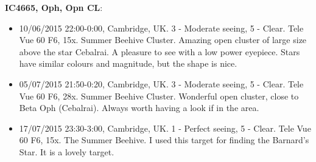 {\bf IC4665, Oph, Opn CL}:
\begin{itemize}
\item 10/06/2015 22:00-0:00, Cambridge, UK. 3 - Moderate seeing, 5 - Clear. Tele Vue 60 F6, 15x. Summer Beehive Cluster. Amazing open cluster of large size above the star Cebalrai. A pleasure to see with a low power eyepiece. Stars have similar colours and magnitude, but the shape is nice.
\item 05/07/2015 21:50-0:20, Cambridge, UK. 3 - Moderate seeing, 5 - Clear. Tele Vue 60 F6, 28x. Summer Beehive Cluster. Wonderful open cluster, close to Beta Oph (Cebalrai). Always worth having a look if in the area.
\item 17/07/2015 23:30-3:00, Cambridge, UK. 1 - Perfect seeing, 5 - Clear. Tele Vue 60 F6, 15x. The Summer Beehive. I used this target for finding the Barnard's Star. It is a lovely target. 
\end{itemize}
